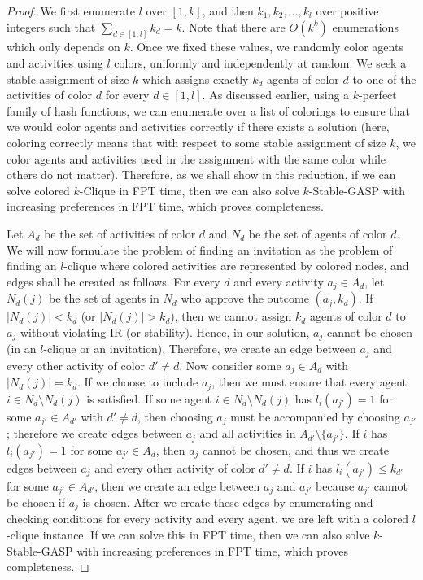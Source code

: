 \begin{proof}
	 We first enumerate $l$ over $[1, k]$, and then $k_1, k_2, \dots, k_l$ over positive integers such that $\sum_{d \in [1,l]} k_d = k$. Note that there are $O(k^k)$ enumerations which only depends on $k$. Once we fixed these values, we randomly color agents and activities using $l$ colors, uniformly and independently at random. We seek a stable assignment of size $k$ which assigns exactly $k_d$ agents of color $d$ to one of the activities of color $d$ for every $d\in [1, l]$. As discussed earlier, using a $k$-perfect family of hash functions, we can enumerate over a list of colorings to ensure that we would color agents and activities correctly if there exists a solution (here, coloring correctly means that with respect to some stable assignment of size $k$, we color agents and activities used in the assignment with the same color while others do not matter). Therefore, as we shall show in this reduction, if we can solve colored $k$-Clique in FPT time, then we can also solve $k$-Stable-GASP with increasing preferences in FPT time, which proves completeness. 
	
	Let $A_d$ be the set of activities of color $d$ and $N_d$ be the set of agents of color $d$. We will now formulate the problem of finding an invitation as the problem of finding an $l$-clique where colored activities are represented by colored nodes, and edges shall be created as follows.	
	For every $d$ and every activity $a_j \in A_d$, let $N_d(j)$ be the set of agents in $N_d$ who approve the outcome $(a_j, k_d)$. If $|N_d(j)| < k_d$ (or $|N_d(j)| > k_d$), then we cannot assign $k_d$ agents of color $d$ to $a_j$ without violating IR (or stability). Hence, in our solution, $a_j$ cannot be chosen (in an $l$-clique or an invitation). Therefore, we create an edge between $a_j$ and every other activity of color $d'\neq d$. Now consider some $a_j\in A_d$ with $|N_d(j)| = k_d$. If we choose to include $a_j$, then we must ensure that every agent $i\in N_d \setminus N_d(j)$ is satisfied. If some agent $i\in N_d \setminus N_d(j)$ has $l_i(a_{j'}) = 1$ for some $a_{j'}\in A_{d'}$ with $d' \neq d$, then choosing $a_j$ must be accompanied by choosing $a_{j'}$; therefore we create edges between $a_j$ and all activities in $A_{d'} \setminus \{a_{j'}\}$. If $i$ has $l_i(a_{j'}) = 1$ for some $a_{j'}\in A_d$, then $a_j$ cannot be chosen, and thus we create edges between $a_j$ and every other activity of color $d'\neq d$. If $i$ has $l_i(a_{j'}) \leq k_{d'}$ for some $a_{j'} \in A_{d'}$, then we create an edge between $a_j$ and $a_{j'}$ because $a_{j'}$ cannot be chosen if $a_j$ is chosen. After we create these edges by enumerating and checking conditions for every activity and every agent, we are left with a colored $l$-clique instance. If we can solve this in FPT time, then we can also solve $k$-Stable-GASP with increasing preferences in FPT time, which proves completeness. 
\end{proof}

